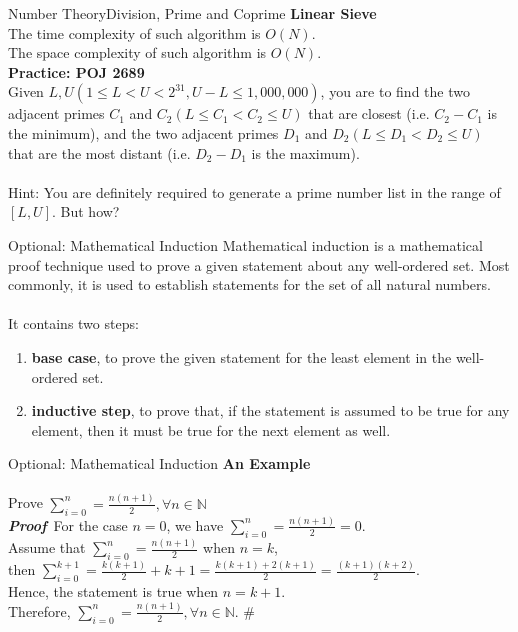 \documentclass[mathserif,10pt]{beamer}
\begin{document}
\begin{frame}{Number Theory}{Division, Prime and Coprime}
\textbf{\large Linear Sieve} \\
The time complexity of such algorithm is $O(N)$. \\
The space complexity of such algorithm is $O(N)$. \\[0.5cm]
\pause
\textbf{Practice: POJ 2689} \\
Given $L, U(1\leq L < U < 2^{31}, U-L\leq 1,000,000)$, you are to find the two adjacent primes $C_1$ and $C_2 (L\leq C_1 < C_2 \leq U)$ that are closest (i.e. $C_2 - C_1$ is the minimum), and the two adjacent primes $D_1$ and $D_2 (L\leq D_1 < D_2 \leq U)$ that are the most distant (i.e. $D_2 - D_1$ is the maximum). 
\\~\\
\pause
Hint: You are definitely required to generate a prime number list in the range of $[L,U]$. But how?
\end{frame}


\begin{frame}{Optional: Mathematical Induction}
Mathematical induction is a mathematical proof technique used to prove a given statement about any well-ordered set. Most commonly, it is used to establish statements for the set of all natural numbers. \\~\\
\pause
It contains two steps:
\begin{enumerate}
\item \textbf{base case}, to prove the given statement for the least element in the well-ordered set. \pause
\item \textbf{inductive step}, to prove that, if the statement is assumed to be true for any element, then it must be true for the next element as well.
\end{enumerate}
\end{frame}

\begin{frame}{Optional: Mathematical Induction}
\textbf{\large An Example}
\\~\\
Prove $\sum_{i=0}^n = \frac{n(n+1)}{2}, \forall n\in \mathbb{N}$ \\[0.5cm]
\pause
\textbf{\sl Proof}~For the case $n=0$, we have $\sum_{i=0}^n=\frac{n(n+1)}{2}=0$. \\[0.2cm]
\pause
Assume that $\sum_{i=0}^n=\frac{n(n+1)}{2}$ when $n=k$, \\[0.2cm]
then $\sum_{i=0}^{k+1}=\frac{k(k+1)}{2}+k+1=\frac{k(k+1)+2(k+1)}{2}=\frac{(k+1)(k+2)}{2}$. \\[0.2cm]
Hence, the statement is true when $n=k+1$. \\[0.2cm]
\pause
Therefore, $\sum_{i=0}^n = \frac{n(n+1)}{2}, \forall n\in \mathbb{N}$. \#
\end{frame}
\end{document}
